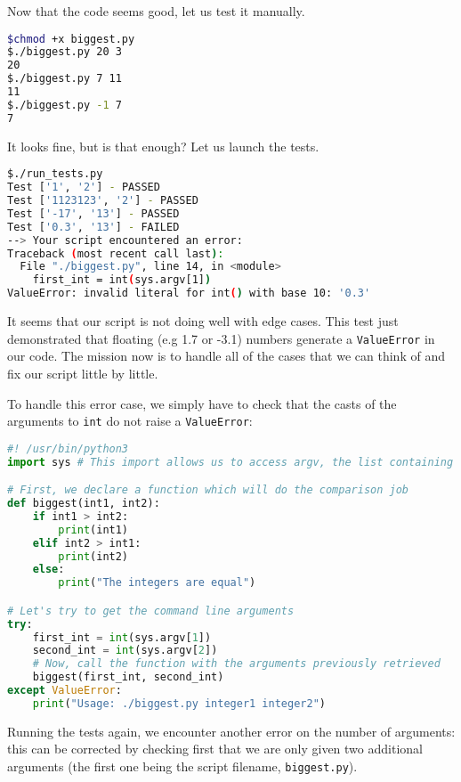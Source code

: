 \documentclass[12pt]{article}
\begin{document}
Now that the code seems good, let us test it manually.

\begin{lstlisting}[language=bash]
$chmod +x biggest.py
$./biggest.py 20 3
20
$./biggest.py 7 11
11
$./biggest.py -1 7
7
\end{lstlisting}

It looks fine, but is that enough? Let us launch the tests.

\begin{lstlisting}[language=bash]
$./run_tests.py
Test ['1', '2'] - PASSED
Test ['1123123', '2'] - PASSED
Test ['-17', '13'] - PASSED
Test ['0.3', '13'] - FAILED
--> Your script encountered an error: 
Traceback (most recent call last):
  File "./biggest.py", line 14, in <module>
    first_int = int(sys.argv[1])
ValueError: invalid literal for int() with base 10: '0.3'
\end{lstlisting}

It seems that our script is not doing well with edge cases. This test just demonstrated that floating (e.g 1.7 or -3.1) numbers generate a \texttt{ValueError} in our code.
The mission now is to handle all of the cases that we can think of and fix our script little by little.

To handle this error case, we simply have to check that the casts of the arguments to \texttt{int} do not raise a \texttt{ValueError}:

\begin{lstlisting}[language=python,style=codestyle,title=biggest.py]
#! /usr/bin/python3
import sys # This import allows us to access argv, the list containing the command line arguments

# First, we declare a function which will do the comparison job
def biggest(int1, int2):
    if int1 > int2:
        print(int1)
    elif int2 > int1:
        print(int2)
    else:
        print("The integers are equal")

# Let's try to get the command line arguments
try:
    first_int = int(sys.argv[1])
    second_int = int(sys.argv[2])
    # Now, call the function with the arguments previously retrieved
    biggest(first_int, second_int)
except ValueError:
    print("Usage: ./biggest.py integer1 integer2")
\end{lstlisting}

Running the tests again, we encounter another error on the number of arguments: this can be corrected by checking first that we are only given two additional arguments (the first one being the script filename, \texttt{biggest.py}).
\end{document}
